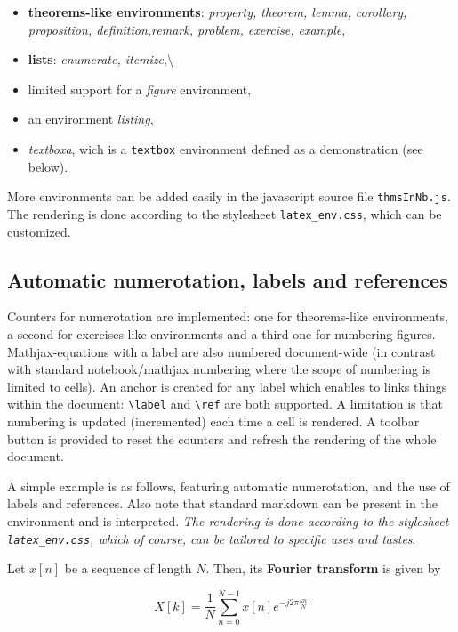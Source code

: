     \begin{itemize}
\itemsep1pt\parskip0pt \item
\textbf{theorems-like environments}: \emph{property, theorem, lemma,
  corollary, proposition, definition,remark, problem, exercise,
  example}, \item \textbf{lists}:
\emph{enumerate, itemize},\textbackslash{} \item limited support for a
\emph{figure} environment, \item an environment \emph{listing}, \item
\emph{textboxa}, wich is a \texttt{textbox} environment defined as a
demonstration (see below).
\end{itemize}

More environments can be added easily in the javascript source file
\texttt{thmsInNb.js}. The rendering is done according to the stylesheet
\texttt{latex\_env.css}, which can be customized.

    \subsection{Automatic numerotation, labels and
references}\label{automatic-numerotation-labels-and-references}

    Counters for numerotation are implemented: one for theorems-like
environments, a second for exercises-like environments and a third one
for numbering figures.\\Mathjax-equations with a label are also numbered
document-wide (in contrast with standard notebook/mathjax numbering
where the scope of numbering is limited to cells). An anchor is created
for any label which enables to links things within the document:
\texttt{\textbackslash{}label} and \texttt{\textbackslash{}ref} are both
supported. A limitation is that numbering is updated (incremented) each
time a cell is rendered. A toolbar button is provided to reset the
counters and refresh the rendering of the whole document.

    A simple example is as follows, featuring automatic numerotation, and
the use of labels and references. Also note that standard markdown can
be present in the environment and is interpreted. \emph{The rendering is
done according to the stylesheet \texttt{latex\_env.css}, which of
course, can be tailored to specific uses and tastes}.

\begin{listing}
\begin{definition}
\label{def:FT} Let $x[n]$ be a sequence of length $N$. Then, its
\textbf{Fourier transform} is given by

\begin{equation}
\label{eq:FT}
X[k]= \frac{1}{N} \sum_{n=0}^{N-1} x[n] e^{-j2\pi \frac{kn}{N}}
\end{equation}
\end{definition}
\end{listing}

